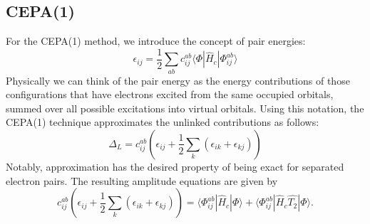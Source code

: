 \documentclass{article}[11pt]
\begin{document}

\subsection*{CEPA(1)}

For the  CEPA(1) method, we introduce the concept of pair energies:
\begin{equation*} 
   \epsilon_{ij}
=
   \frac{1}{2}
   \sum\limits_{ab}
   c_{ij}^{ab}
   \langle \Phi |
      \hat{H}_{{c}}
   | \Phi_{ij}^{ab} \rangle
\end{equation*}
Physically we can think of the pair energy as the energy contributions of those
configurations that have electrons excited from the same occupied orbitals,
summed over all possible excitations into virtual orbitals.
Using this notation, the CEPA(1) technique approximates the unlinked
contributions as follows:
\begin{equation*}
      \Delta_{{L}} 
=
   c_{ij}^{ab}
   \left(
   \epsilon_{ij} 
+
   \frac{1}{2}
   \sum\limits_{k}
      \left(
        \epsilon_{ik}
        +
        \epsilon_{kj}
      \right)
   \right)
\end{equation*}
Notably, approximation has the desired property of being exact for separated
electron pairs.
The resulting amplitude equations are given by
\begin{equation}
    c_{ij}^{ab}
    \left(
   \epsilon_{ij} 
+
   \frac{1}{2}
   \sum\limits_{k}
      \left(
        \epsilon_{ik}
        +
        \epsilon_{kj}
      \right)
   \right)
= 
   \langle \Phi_{ij}^{ab} |
      \hat{H}_c 
   | \Phi \rangle
+
   \langle \Phi_{ij}^{ab} |
      \hat{H}_c
      \hat{T_2}
   | \Phi \rangle.
\end{equation}
\end{document}
